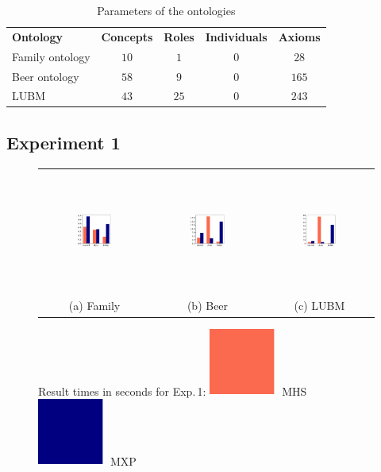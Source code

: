 \documentclass[12pt,a4paper]{article}
\begin{document}
\begin{table}[h!]
	\scriptsize
	\centering
	\caption{Parameters of the ontologies}
	\label{tab:ont}
	\begin{tabular}{lcccc}
		\scriptsize
		\textbf{Ontology} & \textbf{Concepts} & \textbf{Roles} & \textbf{Individuals} & \textbf{Axioms} \\
		Family ontology & $10$ & $1$ & $0$ & $28$\\
		Beer ontology & $58$ & $9$ & $0$ & $165$\\
		LUBM & $43$ & $25$ & $0$ & $243$
	\end{tabular}
\end{table}

\subsection{Experiment 1}

\begin{figure}[H]
	\noindent
	\begin{tabular}{@{}c@{\ }c@{\ }c@{}}
		\includegraphics[width=0.33\textwidth, height=4cm]{eval1Family} 
		&
		\includegraphics[width=0.33\textwidth, height=4cm]{eval1Beer} 
		&
		\includegraphics[width=0.33\textwidth, height=4cm]{eval1LUBM} 
		\\
		(a) Family & (b) Beer & (c) LUBM \\
	\end{tabular}
	\caption{Result times in seconds for Exp.\,1:\quad
		\protect\includegraphics[width=1.5ex]{cl-mhs}~MHS\quad
		\protect\includegraphics[width=1.5ex]{cl-mxp}~MXP
	}
	\label{fig:eval1}
\end{figure}
\end{document}
